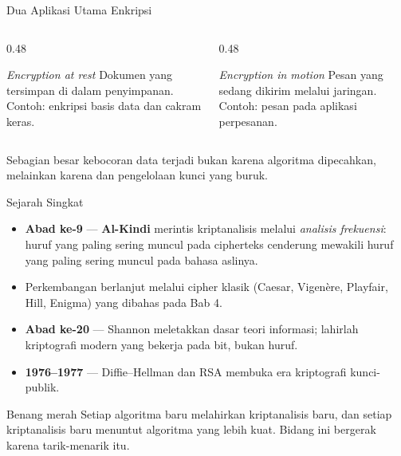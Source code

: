 \documentclass[aspectratio=169,11pt]{beamer}
\begin{document}
\begin{frame}{Dua Aplikasi Utama Enkripsi}
    \begin{columns}[T,onlytextwidth]
        \begin{column}{0.48\textwidth}
            \begin{block}{\textit{Encryption at rest}}
                Dokumen yang tersimpan di dalam penyimpanan.\\
                \footnotesize Contoh: enkripsi basis data dan cakram keras.
            \end{block}
        \end{column}
        \begin{column}{0.48\textwidth}
            \begin{block}{\textit{Encryption in motion}}
                Pesan yang sedang dikirim melalui jaringan.\\
                \footnotesize Contoh: pesan pada aplikasi perpesanan.
            \end{block}
        \end{column}
    \end{columns}
    \vspace{0.35cm}
    Sebagian besar kebocoran data terjadi bukan karena algoritma dipecahkan,
    melainkan karena  dan pengelolaan kunci
    yang buruk.
\end{frame}

\begin{frame}{Sejarah Singkat}
    \begin{itemize}
        \item \textbf{Abad ke-9} --- \textbf{Al-Kindi} merintis kriptanalisis melalui
              \emph{analisis frekuensi}: huruf yang paling sering muncul pada
              cipherteks cenderung mewakili huruf yang paling sering muncul pada
              bahasa aslinya.
        \item Perkembangan berlanjut melalui cipher klasik (Caesar, Vigen\`ere,
              Playfair, Hill, Enigma) yang dibahas pada Bab 4.
        \item \textbf{Abad ke-20} --- Shannon meletakkan dasar teori informasi;
              lahirlah kriptografi modern yang bekerja pada bit, bukan huruf.
        \item \textbf{1976--1977} --- Diffie--Hellman dan RSA membuka era
              kriptografi kunci-publik.
    \end{itemize}
    \vspace{0.3cm}
    \begin{exampleblock}{Benang merah}
        Setiap algoritma baru melahirkan kriptanalisis baru, dan setiap
        kriptanalisis baru menuntut algoritma yang lebih kuat. Bidang ini bergerak
        karena tarik-menarik itu.
    \end{exampleblock}
\end{frame}
\end{document}

